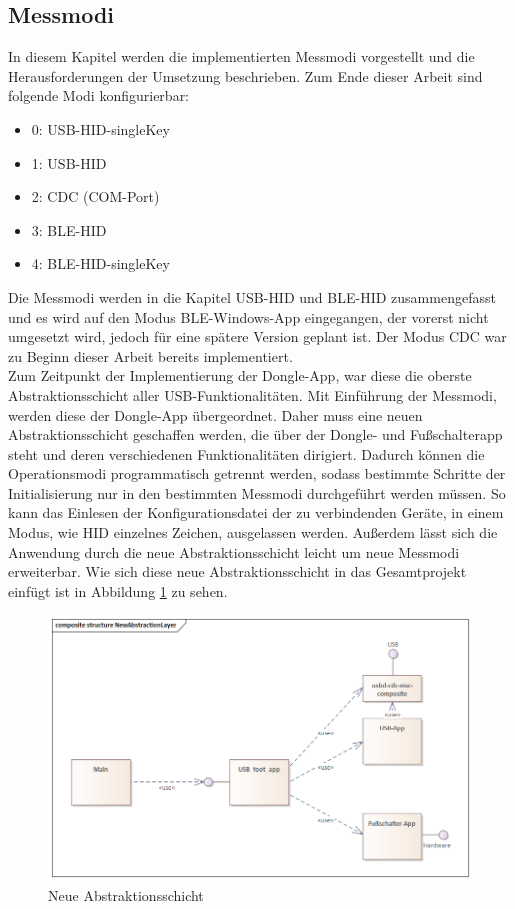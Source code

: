 \subsection{Messmodi}
\label{Messmodi}
In diesem Kapitel werden die implementierten Messmodi vorgestellt und die Herausforderungen der Umsetzung beschrieben. Zum Ende dieser Arbeit sind folgende Modi konfigurierbar:
\begin{itemize}
	\item 0: \ac{USB}-\ac{HID}-singleKey
	\item 1: \ac{USB}-\ac{HID}
	\item 2: \ac{CDC} (COM-Port)
	\item 3: \ac{BLE}-\ac{HID}
	\item 4: \ac{BLE}-\ac{HID}-singleKey
\end{itemize}
Die Messmodi werden in die Kapitel \ac{USB}-\ac{HID} und \ac{BLE}-\ac{HID} zusammengefasst und es wird auf den Modus \ac{BLE}-Windows-App eingegangen, der vorerst nicht umgesetzt wird, jedoch für eine spätere Version geplant ist. Der Modus \ac{CDC} war zu Beginn dieser Arbeit bereits implementiert. \\
Zum Zeitpunkt der Implementierung der Dongle-App, war diese die oberste Abstraktionsschicht aller USB-Funktionalitäten. Mit Einführung der Messmodi, werden diese der Dongle-App übergeordnet. Daher muss eine neuen Abstraktionsschicht geschaffen werden, die über der Dongle- und Fußschalterapp steht und deren verschiedenen Funktionalitäten dirigiert. Dadurch können die Operationsmodi programmatisch getrennt werden, sodass bestimmte Schritte der Initialisierung nur in den bestimmten Messmodi durchgeführt werden müssen. So kann das Einlesen der Konfigurationsdatei der zu verbindenden Geräte, in einem Modus, wie \ac{HID} einzelnes Zeichen, ausgelassen werden. Außerdem lässt sich die Anwendung durch die neue Abstraktionsschicht leicht um neue Messmodi erweiterbar. Wie sich diese neue Abstraktionsschicht in das Gesamtprojekt einfügt ist in Abbildung \ref{fig:NeueAbstraktionsschicht} zu sehen.

\begin{figure}[H] 
	\centering
	\includegraphics[width=\textwidth]{figures/NewAbstractionLayer.png}
	\caption{Neue Abstraktionsschicht}
	\label{fig:NeueAbstraktionsschicht}
\end{figure}

